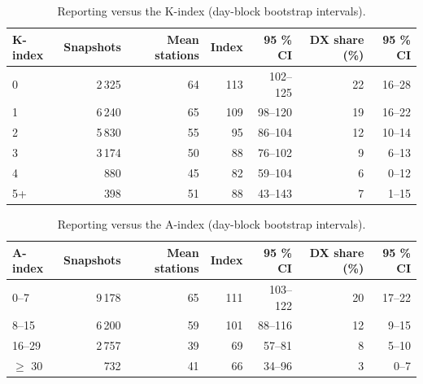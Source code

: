 \begin{table}[htbp]\centering\small
\caption{Reporting versus the K-index (day-block bootstrap intervals).}\label{tab:k}
\begin{tabular}{lrrrrrr}
\toprule
K-index & Snapshots & Mean stations & Index & 95 \% CI & DX share (\%) & 95 \% CI \\
\midrule
0 & 2\,325 & 64 & 113 & 102--125 & 22 & 16--28 \\
1 & 6\,240 & 65 & 109 & 98--120 & 19 & 16--22 \\
2 & 5\,830 & 55 & 95 & 86--104 & 12 & 10--14 \\
3 & 3\,174 & 50 & 88 & 76--102 & 9 & 6--13 \\
4 & 880 & 45 & 82 & 59--104 & 6 & 0--12 \\
5+ & 398 & 51 & 88 & 43--143 & 7 & 1--15 \\
\bottomrule
\end{tabular}
\end{table}

\begin{table}[htbp]\centering\small
\caption{Reporting versus the A-index (day-block bootstrap intervals).}\label{tab:a}
\begin{tabular}{lrrrrrr}
\toprule
A-index & Snapshots & Mean stations & Index & 95 \% CI & DX share (\%) & 95 \% CI \\
\midrule
0--7 & 9\,178 & 65 & 111 & 103--122 & 20 & 17--22 \\
8--15 & 6\,200 & 59 & 101 & 88--116 & 12 & 9--15 \\
16--29 & 2\,757 & 39 & 69 & 57--81 & 8 & 5--10 \\
$\geq$ 30 & 732 & 41 & 66 & 34--96 & 3 & 0--7 \\
\bottomrule
\end{tabular}
\end{table}

